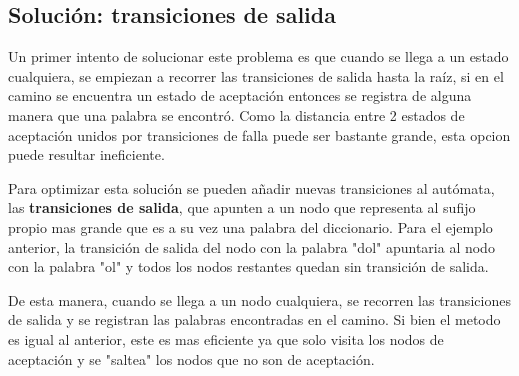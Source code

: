 \documentclass{article}
\begin{document}
\subsection*{Solución: transiciones de salida}

Un primer intento de solucionar este problema es que cuando se llega a un estado cualquiera, se empiezan a recorrer las transiciones de salida
hasta la raíz, si en el camino se encuentra un estado de aceptación entonces se registra de alguna manera que una palabra se encontró.
Como la distancia entre 2 estados de aceptación unidos por transiciones de falla puede ser bastante grande, esta opcion puede resultar ineficiente.

Para optimizar esta solución se pueden añadir nuevas transiciones al autómata, las \textbf{transiciones de salida}, que apunten a un nodo que representa al sufijo
propio mas grande que es a su vez una palabra del diccionario. Para el ejemplo anterior, la transición de salida del nodo con la palabra "dol" apuntaria al nodo con la palabra "ol" y
todos los nodos restantes quedan sin transición de salida.

De esta manera, cuando se llega a un nodo cualquiera, se recorren las transiciones de salida y se registran las palabras encontradas en el camino. Si bien el metodo es igual al anterior, este
es mas eficiente ya que solo visita los nodos de aceptación y se "saltea" los nodos que no son de aceptación.
\end{document}
